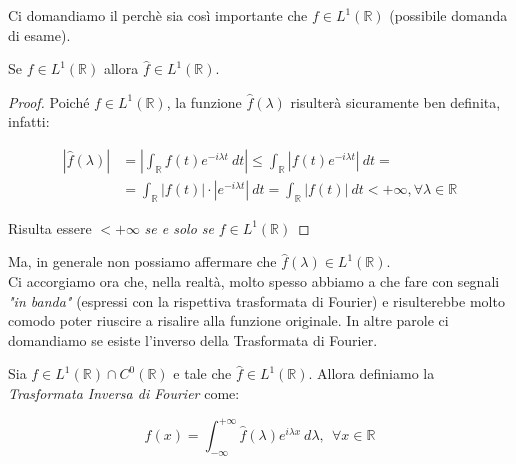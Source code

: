 \vspace{1cm}

Ci domandiamo il perchè sia così importante che $f \in L^1(\mathbb{R})$
(possibile domanda di esame).\\

\begin{center}
    Se $f \in L^1(\mathbb{R})$ allora $\hat{f} \in L^1(\mathbb{R})$.
\end{center}

\begin{proof}
    Poiché $f \in L^1(\mathbb{R})$, la funzione $\hat{f}(\lambda)$ risulterà
    sicuramente ben definita, infatti:

    \begin{equation}
        \begin{aligned}
            |\hat{f}(\lambda)| & = \left|\int_{\mathbb{R}} f(t) e^{-i \lambda t} \ dt \right| \leq \int_{\mathbb{R}} |f(t) e^{-i \lambda t}| \ dt =                  \\
                               & = \int_{\mathbb{R}} |f(t)| \cdot |e^{-i \lambda t}| \ dt = \int_{\mathbb{R}} |f(t)| \ dt < + \infty, \forall \lambda \in \mathbb{R}
        \end{aligned}
    \end{equation}

    Risulta essere $< +\infty$ \textit{se e solo se} $f\in L^1(\mathbb{R})$

\end{proof}

Ma, in generale non possiamo affermare che $\hat{f}(\lambda)
    \in L^1(\mathbb{R})$.\\


Ci accorgiamo ora che, nella realtà, molto spesso abbiamo a che fare con segnali
\textit{"in banda"} (espressi con la rispettiva trasformata di Fourier) e
risulterebbe molto comodo poter riuscire a risalire alla funzione originale. In
altre parole ci domandiamo se esiste l'inverso della Trasformata di Fourier.

\begin{theorem}
    Sia $f \in L^1(\mathbb{R}) \cap C^0(\mathbb{R})$ e tale che $\hat{f} \in
        L^1(\mathbb{R})$. Allora definiamo la \textit{Trasformata Inversa di
        Fourier} come:

    $$
        f(x) = \int_{-\infty}^{+\infty} \hat{f}(\lambda) e^{i \lambda x} \ d\lambda, \ \ \forall x \in \mathbb{R}
    $$
\end{theorem}

